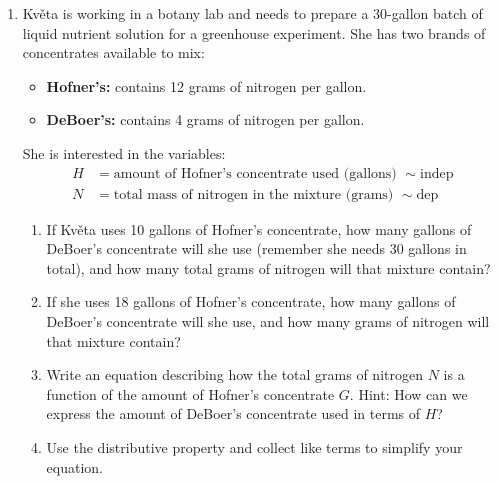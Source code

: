 \begin{enumerate}
Viviana wants to figure out a price for cold brew so that she can take in as much money total revenue as possible.

\begin{enumerate}
    \item What is the total revenue if Viviana prices cold brew at \$4.00 and sells 150 bottles?
    \item Make a table showing how revenue depends on price, including
    $P = 4.00, 4.50, 5.00, 5.50$. 
    Hint: use your answers for demand from the previous problem.
    \item Write an equation for the revenue in terms of price, using 
    $R = \text{total revenue (\$) } \sim \text{dep}$. 
    Hint: use your final equation for demand $D$ from the previous problem and the fact that
    $\text{Revenue} = \text{Price} \times \text{Demand}$.
    \item Use the distributive property to simplify your equation. Hint: it is quadratic.
    \item Check that your simplified equation gives $R = 600$ when $P = 4$.
\end{enumerate}

\item Kv\v{e}ta is working in a botany lab and needs to prepare a 30-gallon batch of liquid nutrient solution for a greenhouse experiment. She has two brands of concentrates available to mix:
\begin{itemize}
    \item \textbf{Hofner's:} contains 12 grams of nitrogen per gallon.
    \item \textbf{DeBoer's:} contains 4 grams of nitrogen per gallon.
\end{itemize}

She is interested in the variables:
\begin{align*}
H &= \text{amount of Hofner's concentrate used (gallons) } \sim \text{indep} \\
N &= \text{total mass of nitrogen in the mixture (grams) } \sim \text{dep}
\end{align*}

\begin{enumerate}
    \item If Kv\v{e}ta uses 10 gallons of Hofner's concentrate, how many gallons of DeBoer's concentrate will she use (remember she needs 30 gallons in total), and how many total grams of nitrogen will that mixture contain?
    \item If she uses 18 gallons of Hofner's concentrate, how many gallons of DeBoer's concentrate will she use, and how many grams of nitrogen will that mixture contain?
    \item Write an equation describing how the total grams of nitrogen $N$ is a function of the amount of Hofner's concentrate $G$. Hint: How can we express the amount of DeBoer's concentrate used in terms of $H$?
    \item Use the distributive property and collect like terms to simplify your equation.
\end{enumerate}

\end{enumerate}

